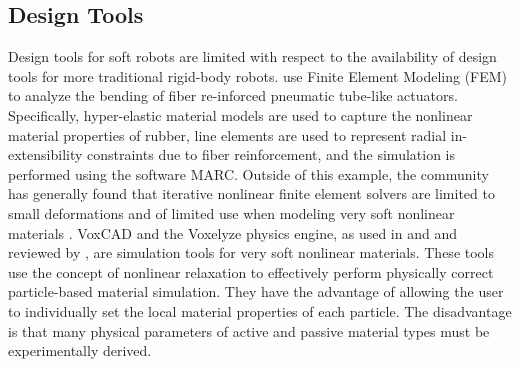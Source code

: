\subsection{Design Tools}
\label{subsec:RW Design Tools}
Design tools for soft robots are limited with respect to the availability of design tools for more traditional rigid-body robots.
\citet{suzumori2007bending} use Finite Element Modeling (FEM) to analyze the bending of fiber re-inforced pneumatic tube-like actuators.
Specifically, hyper-elastic material models are used to capture the nonlinear material properties of rubber, line elements are used to represent radial in-extensibility constraints due to fiber reinforcement, and the simulation is performed using the software MARC.
Outside of this example, the community has generally found that iterative nonlinear finite element solvers are limited to small deformations and of limited use when modeling very soft nonlinear materials \citep{lipson2014challenges}.
VoxCAD and the Voxelyze physics engine, as used in \citet{cheney2013unshackling} and \citet{lehman2011evolving} and reviewed by \citet{lipson2014challenges}, are simulation tools for very soft nonlinear materials.
These tools use the concept of nonlinear relaxation to effectively perform physically correct particle-based material simulation.
They have the advantage of allowing the user to individually set the local material properties of each particle.
The disadvantage is that many physical parameters of active and passive material types must be experimentally derived.

